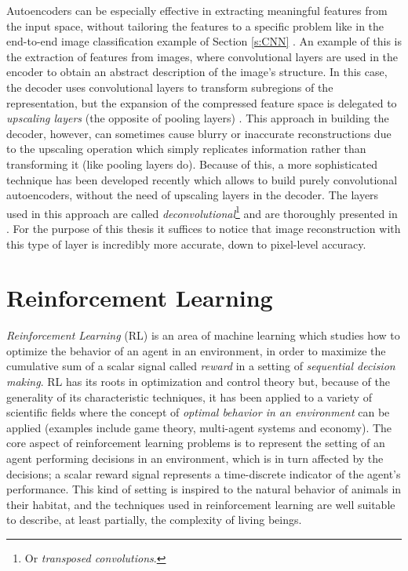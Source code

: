 Autoencoders can be especially effective in extracting meaningful
features from the input space, without tailoring the features to a specific 
problem like in the end-to-end image classification example of Section 
\ref{s:CNN} \cite{erhan2010does}. 
An example of this is the extraction of features from images, 
where convolutional layers are used in the encoder to obtain an abstract 
description of the image's structure. In this case, the decoder uses
convolutional layers to transform subregions of the representation, but the 
expansion of the compressed feature space is delegated to \textit{upscaling 
layers} (the opposite of pooling layers) \cite{masci2011cae}.
This approach in building the decoder, however, can sometimes cause blurry
or inaccurate reconstructions due to the upscaling operation which simply 
replicates information rather than transforming it (like pooling layers do).
Because of this, a more sophisticated technique has been developed recently 
which allows to build purely convolutional autoencoders, without the need of 
upscaling layers in the decoder.
The layers used in this approach are called \textit{deconvolutional}\footnote{Or
\textit{transposed convolutions}.} and are thoroughly presented in 
\cite{zeiler2010deconvolutional}. For the purpose of this thesis it suffices to 
notice that image reconstruction with this type of layer is incredibly more 
accurate, down to pixel-level accuracy.

\section{Reinforcement Learning} \label{s:RL}
\textit{Reinforcement Learning} (RL) is an area of machine learning which
studies how to optimize the behavior of an agent in an environment,
in order to maximize the cumulative sum of a scalar signal called 
\textit{reward} in a setting of \textit{sequential decision making}.
RL has its roots in optimization and control theory but, because of the 
generality of its characteristic techniques, it has been applied to a variety of
scientific fields where the concept of \textit{optimal behavior in an 
environment} can be applied (examples include game theory, multi-agent systems 
and economy).
The core aspect of reinforcement learning problems is to represent the setting
of an agent performing decisions in an environment, which is in turn affected by
the decisions; a scalar reward signal represents a time-discrete indicator of 
the agent's performance. This kind of setting is inspired to the natural 
behavior of animals in their habitat, and the techniques used in reinforcement 
learning are well suitable to describe, at least partially, the complexity of
living beings. 

